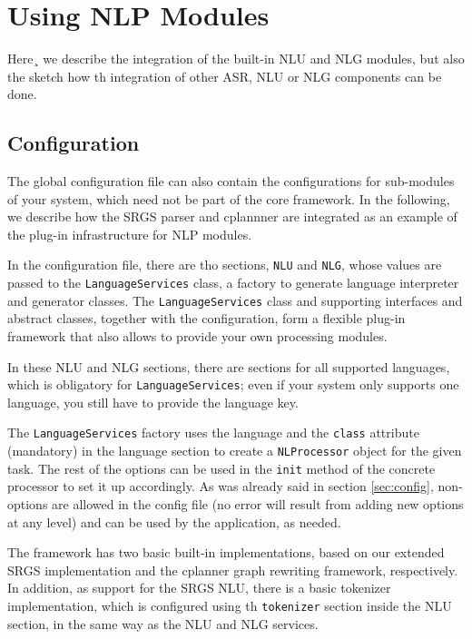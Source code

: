 \chapter{Using NLP Modules} \label{sec:external_nlp}

Here¸ we describe the integration of the built-in NLU and NLG modules,
but also the sketch how th integration of other ASR, NLU or NLG
components can be done.

\section{Configuration}
The global configuration file can also contain the configurations for
sub-modules of your system, which need not be part of the core
framework.  In the following, we describe how the SRGS parser and
cplannner are integrated as an example of the plug-in infrastructure
for NLP modules.

In the configuration file, there are tho sections, \texttt{NLU} and
\texttt{NLG}, whose values are passed to the \texttt{LanguageServices}
class, a factory to generate language interpreter and generator
classes. The \texttt{LanguageServices} class and supporting interfaces
and abstract classes, together with the configuration, form a flexible
plug-in framework that also allows to provide your own processing modules.

In these NLU and NLG sections, there are sections for all supported
languages, which is obligatory for \texttt{LanguageServices}; even if
your system only supports one language, you still have to provide the
language key.

The \texttt{LanguageServices} factory uses the language and the
\texttt{class} attribute (mandatory) in the language section to create
a \texttt{NLProcessor} object for the given task. The rest of the
options can be used in the \texttt{init} method of the concrete
processor to set it up accordingly. As was already said in section
\ref{sec:config}, non-\vonda options are allowed in the config file
(no error will result from adding new options at any level) and can be
used by the application, as needed.

The framework has two basic built-in implementations, based on our
extended SRGS implementation and the cplanner graph rewriting
framework, respectively. In addition, as support for the SRGS NLU,
there is a basic tokenizer implementation, which is configured using
th \texttt{tokenizer} section inside the NLU section, in the same way
as the NLU and NLG services.

